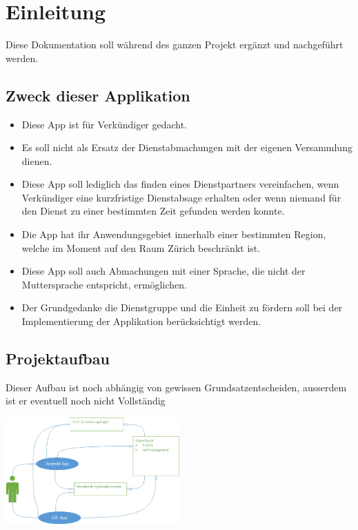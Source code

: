 \section{Einleitung}

Diese Dokumentation soll während des ganzen Projekt ergänzt und nachgeführt werden.
\subsection{Zweck dieser Applikation}
\begin{itemize}
\item Diese App ist für Verkündiger gedacht.
\item Es soll nicht als Ersatz der Dienstabmachungen mit der eigenen Versammlung dienen.
\item Diese App soll lediglich das finden eines Dienstpartners vereinfachen, wenn Verkündiger eine kurzfristige Dienstabsage erhalten oder wenn niemand für den Dienst zu einer bestimmten Zeit gefunden werden konnte.
\item Die App hat ihr Anwendungsgebiet innerhalb einer bestimmten Region, welche im Moment auf den Raum Zürich beschränkt ist.
\item Diese App soll auch Abmachungen mit einer Sprache, die nicht der Muttersprache entspricht, ermöglichen.
\item Der Grundgedanke die Dienstgruppe und die Einheit zu fördern soll bei der Implementierung der Applikation berücksichtigt werden.
\end{itemize}

\subsection{Projektaufbau}

Dieser Aufbau ist noch abhängig von gewissen Grundsatzentscheiden, ausserdem ist er eventuell noch nicht Vollständig 

\begin{center}
\includegraphics[width=0.5\textwidth]{bilder/useCase.png}
\end{center}
